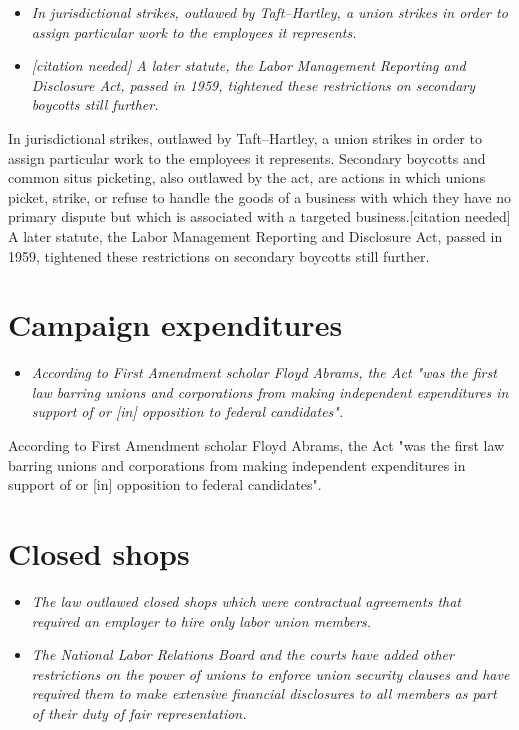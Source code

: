 \begin{itemize}
\item
  \emph{In jurisdictional strikes, outlawed by Taft--Hartley, a union
  strikes in order to assign particular work to the employees it
  represents.}
\item
  \emph{{[}citation needed{]} A later statute, the Labor Management
  Reporting and Disclosure Act, passed in 1959, tightened these
  restrictions on secondary boycotts still further.}
\end{itemize}

In jurisdictional strikes, outlawed by Taft--Hartley, a union strikes in
order to assign particular work to the employees it represents.
Secondary boycotts and common situs picketing, also outlawed by the act,
are actions in which unions picket, strike, or refuse to handle the
goods of a business with which they have no primary dispute but which is
associated with a targeted business.{[}citation needed{]} A later
statute, the Labor Management Reporting and Disclosure Act, passed in
1959, tightened these restrictions on secondary boycotts still further.

\section{Campaign expenditures}\label{campaign-expenditures}

\begin{itemize}
\item
  \emph{According to First Amendment scholar Floyd Abrams, the Act "was
  the first law barring unions and corporations from making independent
  expenditures in support of or {[}in{]} opposition to federal
  candidates".}
\end{itemize}

According to First Amendment scholar Floyd Abrams, the Act "was the
first law barring unions and corporations from making independent
expenditures in support of or {[}in{]} opposition to federal
candidates".

\section{Closed shops}\label{closed-shops}

\begin{itemize}
\item
  \emph{The law outlawed closed shops which were contractual agreements
  that required an employer to hire only labor union members.}
\item
  \emph{The National Labor Relations Board and the courts have added
  other restrictions on the power of unions to enforce union security
  clauses and have required them to make extensive financial disclosures
  to all members as part of their duty of fair representation.}
\end{itemize}

